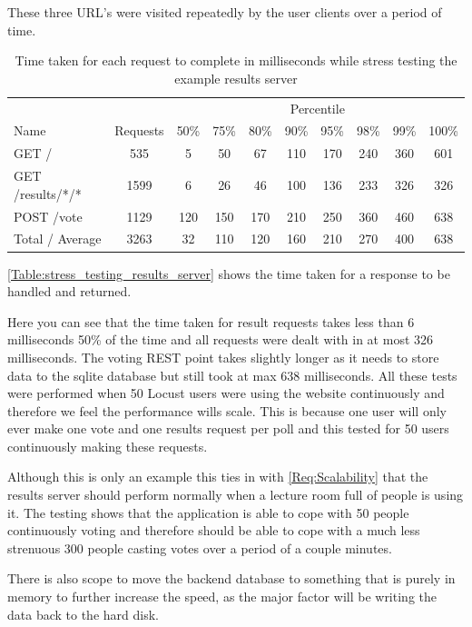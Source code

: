These three URL's were visited repeatedly by the user clients over a period of time.

\begin{table}
\caption{Time taken for each request to complete in milliseconds while stress testing the example results server}
\begin{tabular}{l c  c c c c c c c c }
\hline 
& & \multicolumn{8}{c}{Percentile} \\
Name & Requests & 50\% & 75\% & 80\% & 90\% & 95\% & 98\% & 99\% & 100\% \\ 
\hline 
GET / & 535 & 5 & 50 & 67 & 110 & 170 & 240 & 360 & 601 \\ 
\hline 
GET /results/*/* & 1599 & 6 & 26 & 46 & 100 & 136 & 233 & 326 & 326 \\ 
\hline 
POST /vote & 1129 & 120 & 150 & 170 & 210 & 250 & 360 & 460 & 638 \\ 
\hline 
Total / Average & 3263 & 32 & 110 & 120 & 160 & 210 & 270 & 400 & 638 \\ 
\hline 
\end{tabular}
\label{Table:stress_testing_results_server}
\end{table}

\autoref{Table:stress_testing_results_server} shows the time taken for a response to be handled and returned.

Here you can see that the time taken for result requests takes less than 6 milliseconds 50\% of the time and all requests were dealt with in at most 326 milliseconds. The voting REST point takes slightly longer as it needs to store data to the sqlite database but still took at max 638 milliseconds. All these tests were performed when 50 Locust users were using the website continuously and therefore we feel the performance wills scale. This is because one user will only ever make one vote and one results request per poll and this tested for 50 users continuously making these requests.

Although this is only an example this ties in with \cref{Req:Scalability} that the results server should perform normally when a lecture room full of people is using it. The testing shows that the application is able to cope with 50 people continuously voting and therefore should be able to cope with a much less strenuous 300 people casting votes over a period of a couple minutes.

There is also scope to move the backend database to something that is purely in memory to further increase the speed, as the major factor will be writing the data back to the hard disk.

